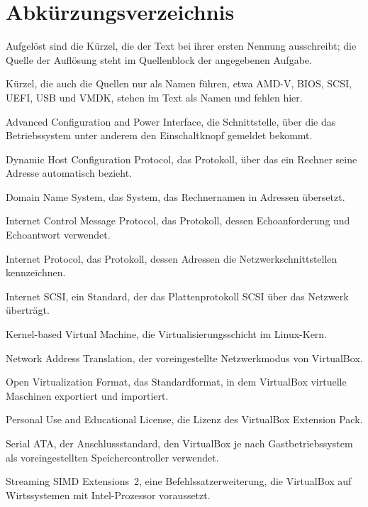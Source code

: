 \chapter{Abkürzungsverzeichnis}
\label{kap:abkuerzungen}

Aufgelöst sind die Kürzel, die der Text bei ihrer ersten Nennung ausschreibt; die Quelle der Auflösung steht im Quellenblock der angegebenen Aufgabe.

Kürzel, die auch die Quellen nur als Namen führen, etwa AMD-V, BIOS, SCSI, UEFI, USB und VMDK, stehen im Text als Namen und fehlen hier.

\begin{glossar}

Advanced Configuration and Power Interface, die Schnittstelle, über die das Betriebssystem unter anderem den Einschaltknopf gemeldet bekommt.

Dynamic Host Configuration Protocol, das Protokoll, über das ein Rechner seine Adresse automatisch bezieht.

Domain Name System, das System, das Rechnernamen in Adressen übersetzt.

Internet Control Message Protocol, das Protokoll, dessen Echoanforderung und Echoantwort  verwendet.

Internet Protocol, das Protokoll, dessen Adressen die Netzwerkschnittstellen kennzeichnen.

Internet SCSI, ein Standard, der das Plattenprotokoll SCSI über das Netzwerk überträgt.

Kernel-based Virtual Machine, die Virtualisierungsschicht im Linux-Kern.

Network Address Translation, der voreingestellte Netzwerkmodus von VirtualBox.

Open Virtualization Format, das Standardformat, in dem VirtualBox virtuelle Maschinen exportiert und importiert.

Personal Use and Educational License, die Lizenz des VirtualBox Extension Pack.

Serial ATA, der Anschlussstandard, den VirtualBox je nach Gastbetriebssystem als voreingestellten Speichercontroller verwendet.

Streaming SIMD Extensions~2, eine Befehlssatzerweiterung, die VirtualBox auf Wirtssystemen mit Intel-Prozessor voraussetzt.


\end{glossar}

